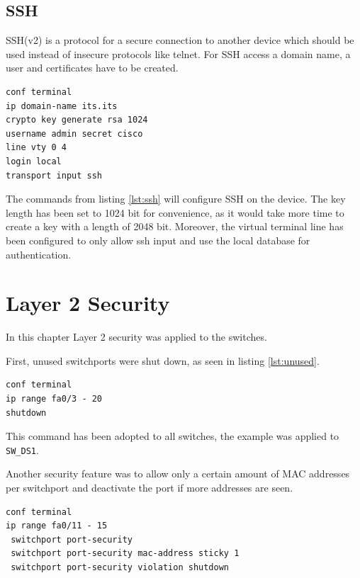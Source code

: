\section{SSH}

\ac{SSH}(v2) is a protocol for a secure connection to another device which should be used instead of insecure protocols like telnet.
For \ac{SSH} access a domain name, a user and certificates have to be created.

\begin{lstlisting}[caption={SSH and user creation},label={lst:ssh},language={}]
conf terminal
ip domain-name its.its
crypto key generate rsa 1024
username admin secret cisco
line vty 0 4
login local
transport input ssh
\end{lstlisting}

The commands from listing \ref{lst:ssh} will configure SSH on the device. The key length has been set to 1024 bit for convenience, as it would take more time to create a key with a length of 2048 bit. Moreover, the virtual terminal line has been configured to only allow ssh input and use the local database for authentication.

\chapter{Layer 2 Security}

In this chapter Layer 2 security was applied to the switches.

First, unused switchports were shut down, as seen in listing \ref{lst:unused}.

\begin{lstlisting}[caption={Shutdown unused ports},label={lst:unused},language={}]
conf terminal
ip range fa0/3 - 20
shutdown
\end{lstlisting}

This command has been adopted to all switches, the example was applied to \texttt{SW\_DS1}.

Another security feature was to allow only a certain amount of \ac{MAC} addresses per switchport and deactivate the port if more addresses are seen.

\begin{lstlisting}[caption={Sticky MAC addresses},label={lst:mac},language={}]
conf terminal
ip range fa0/11 - 15
 switchport port-security
 switchport port-security mac-address sticky 1
 switchport port-security violation shutdown
\end{lstlisting}

